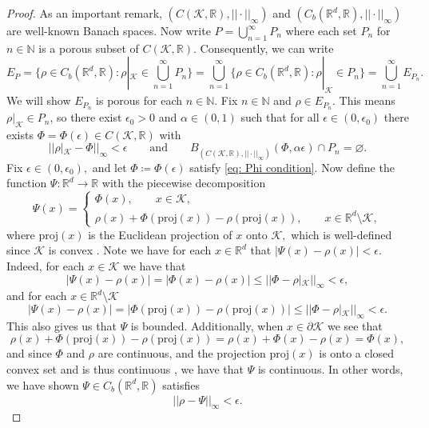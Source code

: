 \documentclass{article}
\newcommand{\R}{\mathbb{R}}
\newcommand{\N}{\mathbb{N}}
\begin{document}
\begin{proof} As an important remark, $(C(\mathcal{K},\R), ||\cdot||_\infty)$ and $(C_b(\R^d,\R), ||\cdot||_\infty)$ are well-known Banach spaces. Now write $P = \bigcup_{n = 1}^\infty P_n$ where each set $P_n$ for $n \in \N$ is a porous subset of $C(\mathcal{K},\R)$. Consequently, we can write $$E_P = \bigg\{\rho \in C_b(\R^d,\R): \rho|_{\mathcal{K}} \in \bigcup_{n =1}^\infty{P_n}\bigg\} = \bigcup_{n =1}^\infty\{\rho \in C_b(\R^d,\R): \rho|_{\mathcal{K}} \in {P_n}\} = \bigcup_{n = 1}^\infty E_{P_n}.$$
    We will show $E_{P_n}$ is porous for each $n \in \N$. Fix $n \in \N$ and $\rho \in E_{P_n}.$ This means $\rho|_{\mathcal{K}} \in P_n$, so there exist $\epsilon_0>0$ and $\alpha \in (0,1)$ such that for all $\epsilon\in (0,\epsilon_0)$ there exists $\Phi =\Phi(\epsilon)\in C(\mathcal{K},\R)$ with
    \begin{equation} \label{eq: Phi condition}
        ||\rho|_{\mathcal{K}} - \Phi||_\infty< \epsilon \qquad \text{and} \qquad B_{(C(\mathcal{K},\R),||\cdot||_\infty)}(\Phi, \alpha \epsilon) \cap P_n = \varnothing.
    \end{equation}
   Fix $\epsilon \in (0,\epsilon_0),$ and let $\Phi \coloneqq \Phi(\epsilon)$ satisfy \eqref{eq: Phi condition}. Now define the function $\Psi:\R^d\to \R$ with the piecewise decomposition
    \begin{equation*}
        \Psi(x) =\begin{cases}
            \Phi(x), \qquad x \in \mathcal{K},\\
            \rho(x) + \Phi(\text{proj}(x)) - \rho(\text{proj}(x)), \qquad x \in \R^d \setminus \mathcal{K},
        \end{cases}
    \end{equation*} where $\text{proj}(x)$ is the Euclidean projection of $x$ onto $\mathcal{K},$ which is well-defined since $\mathcal{K}$ is convex \cite{bauschke2017convex}. Note we have for each $x \in \R^d$ that $|\Psi(x) - \rho(x)| < \epsilon.$ Indeed, for each $x \in \mathcal{K}$ we have that $$|\Psi(x)-\rho(x)| = |\Phi(x) - \rho(x)| \leq ||\Phi-\rho|_{\mathcal{K}}||_\infty < \epsilon,$$ and for each $x \in \R^d \setminus\mathcal{K}$ $$|\Psi(x)-\rho(x)| = |\Phi(\text{proj}(x)) - \rho(\text{proj}(x))| \leq  ||\Phi-\rho|_{\mathcal{K}}||_\infty < \epsilon.$$ This also gives us that $\Psi$ is bounded. Additionally, when $x \in \partial\mathcal{K}$ we see that $$\rho(x) + \Phi(\text{proj}(x)) - \rho(\text{proj}(x)) = \rho(x) + \Phi(x) - \rho(x) = \Phi(x),$$ and since $\Phi$ and $\rho$ are continuous, and the projection $\text{proj}(x)$ is onto a closed convex set and is thus continuous \cite[Proposition $4.8$]{bauschke2017convex}, we have that $\Psi$ is continuous. In other words, we have shown $\Psi \in C_b(\R^d,\R)$ satisfies $$||\rho-\Psi||_\infty < \epsilon.$$

\end{proof}
\end{document}
